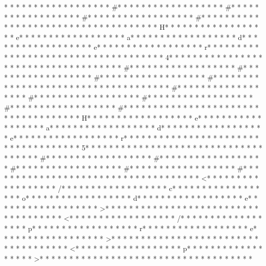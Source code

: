 * * *  * * *  * * *  *  * * *  *  * * *  * #* * *  * * *  * * *  *  * * *  *  * * *  * #* * *  * * *  * * *  *  * * *  *  * * *  * #* * *  * * *  * * *  *  * * *  *  * * *  * #* * *  * * *  * * *  *  * * *  *  * * *  *  * * *  * * *  * * *  *  * * *  *  * * *  * H* * *  * * *  * * *  *  * * *  *  * * *  * e* * *  * * *  * * *  *  * * *  *  * * *  * a* * *  * * *  * * *  *  * * *  *  * * *  * d* * *  * * *  * * *  *  * * *  *  * * *  * e* * *  * * *  * * *  *  * * *  *  * * *  * r* * *  * * *  * * *  *  * * *  *  * * *  *  * * *  * * *  * * *  *  * * *  *  * * *  * 4* * *  * * *  * * *  *  * * *  *  * * *  *  * * *  * * *  * * *  *  * * *  *  * * *  * #* * *  * * *  * * *  *  * * *  *  * * *  * #* * *  * * *  * * *  *  * * *  *  * * *  * #* * *  * * *  * * *  *  * * *  *  * * *  * #* * *  * * *  * * *  *  * * *  *  * * *  * 
* * *  * * *  * * *  *  * * *  *  * * *  * #* * *  * * *  * * *  *  * * *  *  * * *  * #* * *  * * *  * * *  *  * * *  *  * * *  * #* * *  * * *  * * *  *  * * *  *  * * *  * #* * *  * * *  * * *  *  * * *  *  * * *  * #* * *  * * *  * * *  *  * * *  *  * * *  *  * * *  * * *  * * *  *  * * *  *  * * *  * H* * *  * * *  * * *  *  * * *  *  * * *  * e* * *  * * *  * * *  *  * * *  *  * * *  * a* * *  * * *  * * *  *  * * *  *  * * *  * d* * *  * * *  * * *  *  * * *  *  * * *  * e* * *  * * *  * * *  *  * * *  *  * * *  * r* * *  * * *  * * *  *  * * *  *  * * *  *  * * *  * * *  * * *  *  * * *  *  * * *  * 5* * *  * * *  * * *  *  * * *  *  * * *  *  * * *  * * *  * * *  *  * * *  *  * * *  * #* * *  * * *  * * *  *  * * *  *  * * *  * #* * *  * * *  * * *  *  * * *  *  * * *  * #* * *  * * *  * * *  *  * * *  *  * * *  * #* * *  * * *  * * *  *  * * *  *  * * *  * #* * *  * * *  * * *  *  * * *  *  * * *  * 
* * *  * * *  * * *  *  * * *  *  * * *  * <* * *  * * *  * * *  *  * * *  *  * * *  * /* * *  * * *  * * *  *  * * *  *  * * *  * c* * *  * * *  * * *  *  * * *  *  * * *  * o* * *  * * *  * * *  *  * * *  *  * * *  * d* * *  * * *  * * *  *  * * *  *  * * *  * e* * *  * * *  * * *  *  * * *  *  * * *  * >* * *  * * *  * * *  *  * * *  *  * * *  * 
* * *  * * *  * * *  *  * * *  *  * * *  * <* * *  * * *  * * *  *  * * *  *  * * *  * /* * *  * * *  * * *  *  * * *  *  * * *  * p* * *  * * *  * * *  *  * * *  *  * * *  * r* * *  * * *  * * *  *  * * *  *  * * *  * e* * *  * * *  * * *  *  * * *  *  * * *  * >* * *  * * *  * * *  *  * * *  *  * * *  * 
* * *  * * *  * * *  *  * * *  *  * * *  * <* * *  * * *  * * *  *  * * *  *  * * *  * p* * *  * * *  * * *  *  * * *  *  * * *  * >* * *  * * *  * * *  *  * * *  *  * * *  * 
* * *  * * *  * * *  *  * * *  *  * * *  * 
